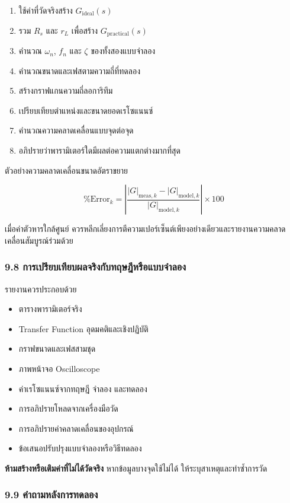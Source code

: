 \begin{enumerate}
    \item ใช้ค่าที่วัดจริงสร้าง $G_{\text{ideal}}(s)$
    \item รวม $R_s$ และ $r_L$ เพื่อสร้าง $G_{\text{practical}}(s)$
    \item คำนวณ $\omega_n$, $f_n$ และ $\zeta$ ของทั้งสองแบบจำลอง
    \item คำนวณขนาดและเฟสตามความถี่ที่ทดลอง
    \item สร้างกราฟแกนความถี่ลอการิทึม
    \item เปรียบเทียบตำแหน่งและขนาดยอดเรโซแนนซ์
    \item คำนวณความคลาดเคลื่อนแบบจุดต่อจุด
    \item อภิปรายว่าพารามิเตอร์ใดมีผลต่อความแตกต่างมากที่สุด
\end{enumerate}

ตัวอย่างความคลาดเคลื่อนขนาดอัตราขยาย

\[
\%\text{Error}_k
=
\left|
\frac{|G|_{\text{meas},k}-|G|_{\text{model},k}}
{|G|_{\text{model},k}}
\right|\times100
\]

เมื่อค่าตัวหารใกล้ศูนย์ ควรหลีกเลี่ยงการตีความเปอร์เซ็นต์เพียงอย่างเดียวและรายงานความคลาดเคลื่อนสัมบูรณ์ร่วมด้วย

\subsubsection{9.8 การเปรียบเทียบผลจริงกับทฤษฎีหรือแบบจำลอง}

รายงานควรประกอบด้วย

\begin{itemize}
    \item ตารางพารามิเตอร์จริง
    \item Transfer Function อุดมคติและเชิงปฏิบัติ
    \item กราฟขนาดและเฟสสามชุด
    \item ภาพหน้าจอ Oscilloscope
    \item ค่าเรโซแนนซ์จากทฤษฎี จำลอง และทดลอง
    \item การอภิปรายโหลดจากเครื่องมือวัด
    \item การอภิปรายค่าคลาดเคลื่อนของอุปกรณ์
    \item ข้อเสนอปรับปรุงแบบจำลองหรือวิธีทดลอง
\end{itemize}

\textbf{ห้ามสร้างหรือเติมค่าที่ไม่ได้วัดจริง} หากข้อมูลบางจุดใช้ไม่ได้ ให้ระบุสาเหตุและทำซ้ำการวัด

\subsubsection{9.9 คำถามหลังการทดลอง}

